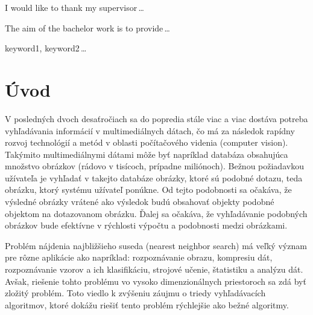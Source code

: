 \documentclass[12pt,a4paper,oneside]{fithesis2}
\begin{document}
  \FrontMatter                    %
    \ThesisTitlePage                %
    \begin{ThesisDeclaration}       %
      \DeclarationText
      \AdvisorName
    \end{ThesisDeclaration}
    \begin{ThesisThanks}            %
      I would like to thank my supervisor\,\dots
    \end{ThesisThanks}
    \begin{ThesisAbstract}          %
      The aim of the bachelor work is to provide\,\dots
    \end{ThesisAbstract}
    \begin{ThesisKeyWords}          %
      keyword1, keyword2\,\dots
    \end{ThesisKeyWords}
    \tableofcontents                %
  
  \MainMatter                     %
    \chapter{Úvod}          %
    V posledných dvoch desaťročiach sa do popredia stále viac a viac dostáva potreba vyhľadávania informácií v multimediálnych dátach, čo má za následok rapídny rozvoj technológií a metód v oblasti počítačového videnia (computer vision). Takýmito multimediálnymi dátami môže byť napríklad databáza obsahujúca množstvo obrázkov (rádovo v tisícoch, prípadne miliónoch). Bežnou požiadavkou užívateľa je vyhľadať 
v takejto databáze obrázky, ktoré sú podobné dotazu, teda obrázku, ktorý systému užívateľ ponúkne. Od tejto podobnosti sa očakáva, že výsledné obrázky vrátené ako výsledok budú obsahovať objekty podobné objektom na dotazovanom obrázku. Ďalej sa očakáva, že vyhľadávanie podobných obrázkov bude efektívne v rýchlosti výpočtu a podobnosti medzi obrázkami.

Problém nájdenia najbližšieho suseda (nearest neighbor search) má veľký význam pre rôzne aplikácie ako napríklad: rozpoznávanie obrazu, kompresiu dát, rozpoznávanie vzorov a ich klasifikáciu, strojové učenie, štatistiku a analýzu dát. Avšak, riešenie tohto problému vo vysoko dimenzionálnych priestoroch sa zdá byť zložitý problém. Toto viedlo k zvýšeniu záujmu o triedy vyhľadávacích algoritmov, ktoré dokážu riešiť tento problém rýchlejšie ako bežné algoritmy.
\end{document}
